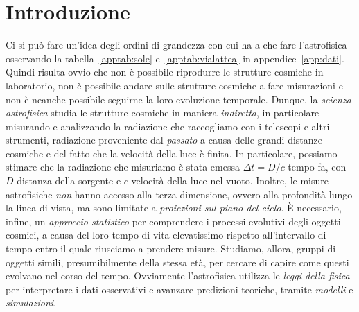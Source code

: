 \section{Introduzione}\label{sec:introduzione}
Ci si può fare un'idea degli ordini di grandezza con cui ha a che fare l'astrofisica osservando la tabella~\ref{apptab:sole} e~\ref{apptab:vialattea} in appendice~\ref{app:dati}. Quindi risulta ovvio che non è possibile riprodurre le strutture cosmiche in laboratorio, non è possibile andare sulle strutture cosmiche a fare misurazioni e non è neanche possibile seguirne la loro evoluzione temporale. Dunque, la \emph{scienza astrofisica} studia le strutture cosmiche in maniera \emph{indiretta}, in particolare misurando e analizzando la radiazione che raccogliamo con i telescopi e altri strumenti, radiazione proveniente dal \emph{passato} a causa delle grandi distanze cosmiche e del fatto che la velocità della luce è finita. In particolare, possiamo stimare che la radiazione che misuriamo è stata emessa $\Delta t = D / c$ tempo fa, con $D$ distanza della sorgente e $c$ velocità della luce nel vuoto. Inoltre, le misure astrofisiche \emph{non} hanno accesso alla terza dimensione, ovvero alla profondità lungo la linea di vista, ma sono limitate a \emph{proiezioni sul piano del cielo}. È necessario, infine, un \emph{approccio statistico} per comprendere i processi evolutivi degli oggetti cosmici, a causa del loro tempo di vita elevatissimo rispetto all'intervallo di tempo entro il quale riusciamo a prendere misure. Studiamo, allora, gruppi di oggetti simili, presumibilmente della stessa età, per cercare di capire come questi evolvano nel corso del tempo. Ovviamente l'astrofisica utilizza le \emph{leggi della fisica} per interpretare i dati osservativi e avanzare predizioni teoriche, tramite \emph{modelli} e \emph{simulazioni}. 